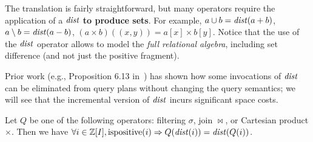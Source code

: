 The translation is fairly straightforward, but many operators require
the application of a $\mathit{dist}$ \textbf{to produce sets}.
For example, $a \cup b = \mathit{dist}(a + b)$, $a \setminus b =
\mathit{dist}(a - b)$, $(a \times b)((x,y)) = a[x] \times b[y]$.
%
%
%
%
%
%
%
Notice that the use of the $\mathit{dist}$ operator allows \dbsp to model
the \emph{full relational algebra}, including set difference (and not
just the positive fragment).

Prior work (e.g., Proposition 6.13 in~\cite{green-tcs11}) has shown
how some invocations of $\mathit{dist}$ can be eliminated from query plans
without changing the query semantics; we will see that the incremental
version of $\mathit{dist}$ incurs significant space costs.

\begin{proposition}\label{prop-distinct-delay}
Let $Q$ be one of the following \zrs operators: filtering $\sigma$,
join $\bowtie$, or Cartesian product $\times$.
Then we have $\forall i \in \mathbb{Z}[I], \mbox{ispositive}(i) \Rightarrow Q(\mathit{dist}(i)) = \mathit{dist}(Q(i))$.
\end{proposition}

